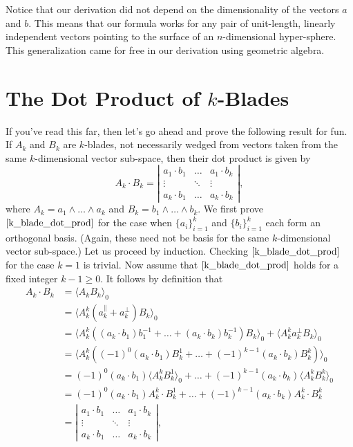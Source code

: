 \documentclass{article}
\newcommand{\prl}{\parallel}
\newcommand{\prp}{\perp}
\begin{document}
Notice that our derivation did not depend on the dimensionality of
the vectors $a$ and $b$.  This means that our formula works for any
pair of unit-length, linearly independent vectors pointing to the
surface of an $n$-dimensional hyper-sphere.  This generalization
came for free in our derivation using geometric algebra.

\section{The Dot Product of $k$-Blades}

If you've read this far, then let's go ahead and
prove the following result for fun.  If $A_k$ and $B_k$ are $k$-blades, not
necessarily wedged from vectors taken from the same $k$-dimensional
vector sub-space, then their dot product is given by
\begin{equation}\label{k_blade_dot_prod}
A_k\cdot B_k = \left|\begin{array}{ccc}
a_1\cdot b_1 & \dots & a_1\cdot b_k \\
\vdots & \ddots & \vdots \\
a_k\cdot b_1 & \dots & a_k\cdot b_k
\end{array}\right|,
\end{equation}
where $A_k=a_1\wedge\dots\wedge a_k$ and $B_k=b_1\wedge\dots\wedge b_k$.
We first prove $\eqref{k_blade_dot_prod}$ for the case when $\{a_i\}_{i=1}^k$
and $\{b_i\}_{i=1}^k$ each form an orthogonal basis.  (Again, these need
not be basis for the same $k$-dimensional vector sub-space.)
Let us proceed by induction.  Checking $\eqref{k_blade_dot_prod}$ for the case
$k=1$ is trivial.  Now assume that $\eqref{k_blade_dot_prod}$ holds for a
fixed integer $k-1\geq 0$.  It follows by definition that
\begin{align*}
A_k\cdot B_k &= \langle A_kB_k\rangle_0 \\
 &= \langle A_k^k(a_k^{\prl} + a_k^{\prp})B_k\rangle_0 \\
 &= \langle A_k^k((a_k\cdot b_1)b_1^{-1} + \dots + (a_k\cdot b_k)b_k^{-1})B_k\rangle_0+
\langle A_k^ka_k^{\prp}B_k\rangle_0 \\
 &= \langle A_k^k((-1)^0(a_k\cdot b_1)B_k^1 + \dots + (-1)^{k-1}(a_k\cdot b_k)B_k^k)\rangle_0 \\
 &= (-1)^0(a_k\cdot b_1)\langle A_k^k B_k^1\rangle_0 + \dots + (-1)^{k-1}(a_k\cdot b_k)\langle A_k^k B_k^k\rangle_0 \\
 &= (-1)^0(a_k\cdot b_1)A_k^k\cdot B_k^1 + \dots + (-1)^{k-1}(a_k\cdot b_k)A_k^k\cdot B_k^k \\
 &= \left|\begin{array}{ccc}
a_1\cdot b_1 & \dots & a_1\cdot b_k \\
\vdots & \ddots & \vdots \\
a_k\cdot b_1 & \dots & a_k\cdot b_k
\end{array}\right|,
\end{align*}
\end{document}
